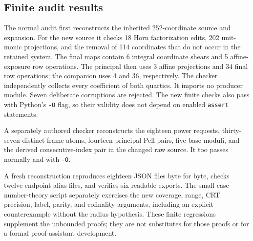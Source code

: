 \subsection{Finite audit results}

The normal audit first reconstructs the inherited 252-coordinate source
and expansion. For the new source it checks 18 Horn factorization edits,
202 unit-monic projections, and the removal of 114 coordinates
that do not occur in the retained system. The final maps contain
6 integral coordinate shears and 5 affine-exposure row
operations. The principal then uses 3 affine projections and 34
final row operations; the companion uses 4 and 36, respectively.
The checker independently collects every coefficient of both quartics.
It imports no producer module. Seven deliberate corruptions are rejected.
The new finite checks also pass with Python's \texttt{-O} flag, so their
validity does not depend on enabled \texttt{assert} statements.

A separately authored checker reconstructs the eighteen power requests,
thirty-seven distinct frame atoms, fourteen principal Pell pairs, five
base moduli, and the derived consecutive-index pair in the changed raw
source. It too passes normally and with \texttt{-O}.

A fresh reconstruction reproduces eighteen JSON files byte for byte,
checks twelve endpoint alias files, and verifies six readable exports.
The small-case number-theory script separately exercises the new coverage,
range, CRT precision, label, parity, and cofinality arguments, including
an explicit counterexample without the radius hypothesis. These finite
regressions supplement the unbounded proofs; they are not substitutes for
those proofs or for a formal proof-assistant development.
